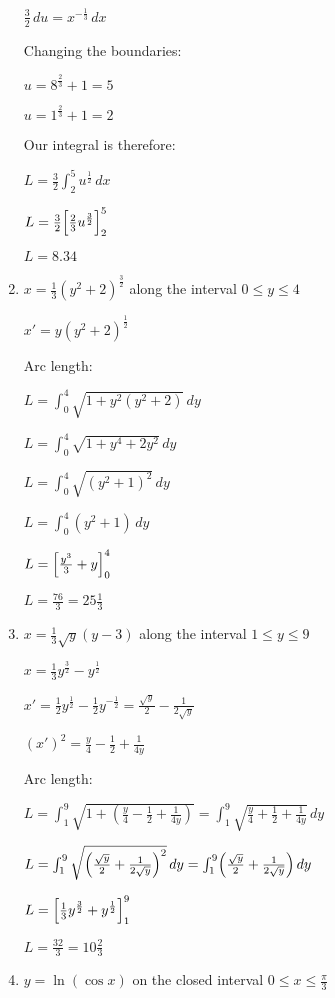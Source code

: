 \documentclass[../main.tex]{subfiles}
\begin{document}
\begin{enumerate}[itemsep=0.7cm]
    $\frac{3}{2}\,du=x^{-\frac{1}{3}}\,dx$

    Changing the boundaries:

    $u=8^{\frac{2}{3}}+1=5$

    $u=1^{\frac{2}{3}}+1=2$

    Our integral is therefore:

    $L=\frac{3}{2}\int_2^5 u^{\frac{1}{2}}\,dx$

    $L=\frac{3}{2}\Bigl[\frac{2}{3}u^{\frac{3}{2}}\Bigr]_2^5$

    $L=8.34$

    \item 
    $x=\frac{1}{3}(y^2+2)^{\frac{3}{2}}$ along the interval $0\leq y \leq 4$

    $x'=y(y^2+2)^{\frac{1}{2}}$

    Arc length:

    $L=\int_0^4 \sqrt{1+y^2(y^2+2)}\,dy$

    $L=\int_0^4 \sqrt{1+y^4+2y^2}\,dy$

    $L=\int_0^4 \sqrt{(y^2+1)^2}\,dy$

    $L=\int_0^4 (y^2+1)\,dy$

    $L=\Bigl[\frac{y^3}{3}+y\Bigr]_0^4$

    $L=\frac{76}{3}=25\frac{1}{3}$

    \item 
    $x=\frac{1}{3}\sqrt{y}(y-3)$ along the interval $1\leq y \leq 9$

    $x=\frac{1}{3}y^{\frac{3}{2}}-y^{\frac{1}{2}}$

    $x'=\frac{1}{2}y^{\frac{1}{2}}-\frac{1}{2}y^{-\frac{1}{2}}=\frac{\sqrt{y}}{2}-\frac{1}{2\sqrt{y}}$

    $(x')^2=\frac{y}{4}-\frac{1}{2}+\frac{1}{4y}$

    Arc length:

    $L=\int_1^9 \sqrt{1+(\frac{y}{4}-\frac{1}{2}+\frac{1}{4y})}= \int_1^9\sqrt{\frac{y}{4}+\frac{1}{2}+\frac{1}{4y}}\,dy$

    $L=\int_1^9 \sqrt{\Bigl(\frac{\sqrt{y}}{2}+\frac{1}{2\sqrt{y}}\Bigr)^2}\,dy=\int_1^9 \Bigl(\frac{\sqrt{y}}{2}+\frac{1}{2\sqrt{y}}\Bigr)\,dy$

    $L=\Bigl[\frac{1}{3}y^{\frac{3}{2}}+y^{\frac{1}{2}}\Bigr]_1^9$

    $L=\frac{32}{3}=10\frac{2}{3}$

    \item 
    $y=\ln{(\cos{x})}$ on the closed interval $0 \leq x \leq \frac{\pi}{3}$


\end{enumerate}
\end{document}
